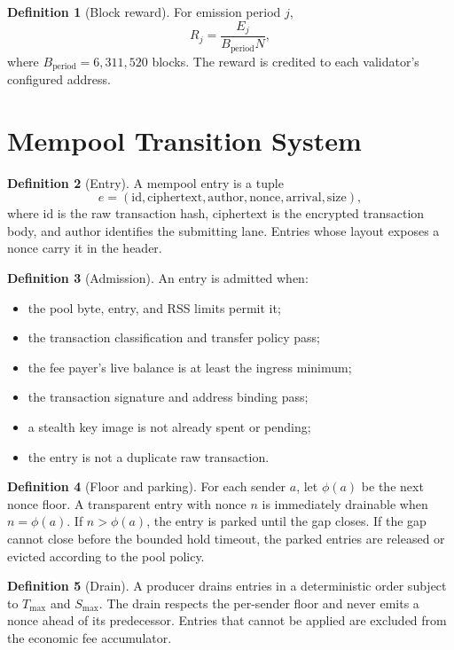 \documentclass[11pt,a4paper]{article}
\theoremstyle{definition}
\newtheorem{definition}{Definition}[section]
\theoremstyle{plain}
\begin{document}
\begin{definition}[Block reward]
For emission period $j$,
\[
  R_j=\frac{E_j}{B_{\mathrm{period}}N},
\]
where $B_{\mathrm{period}}=6{,}311{,}520$ blocks. The reward is credited to
each validator's configured address.
\end{definition}

\section{Mempool Transition System}

\begin{definition}[Entry]
A mempool entry is a tuple
\[
  e=(\mathrm{id},\mathrm{ciphertext},\mathrm{author},\mathrm{nonce},
  \mathrm{arrival},\mathrm{size}),
\]
where $\mathrm{id}$ is the raw transaction hash, $\mathrm{ciphertext}$ is the
encrypted transaction body, and $\mathrm{author}$ identifies the submitting
lane. Entries whose layout exposes a nonce carry it in the header.
\end{definition}

\begin{definition}[Admission]
An entry is admitted when:
\begin{itemize}[leftmargin=*]
  \item the pool byte, entry, and RSS limits permit it;
  \item the transaction classification and transfer policy pass;
  \item the fee payer's live balance is at least the ingress minimum;
  \item the transaction signature and address binding pass;
  \item a stealth key image is not already spent or pending;
  \item the entry is not a duplicate raw transaction.
\end{itemize}
\end{definition}

\begin{definition}[Floor and parking]
For each sender $a$, let $\phi(a)$ be the next nonce floor. A transparent
entry with nonce $n$ is immediately drainable when $n=\phi(a)$. If $n>\phi(a)$,
the entry is parked until the gap closes. If the gap cannot close before the
bounded hold timeout, the parked entries are released or evicted according to
the pool policy.
\end{definition}

\begin{definition}[Drain]
A producer drains entries in a deterministic order subject to
$T_{\max}$ and $S_{\max}$. The drain respects the per-sender floor and never
emits a nonce ahead of its predecessor. Entries that cannot be applied are
excluded from the economic fee accumulator.
\end{definition}
\end{document}
